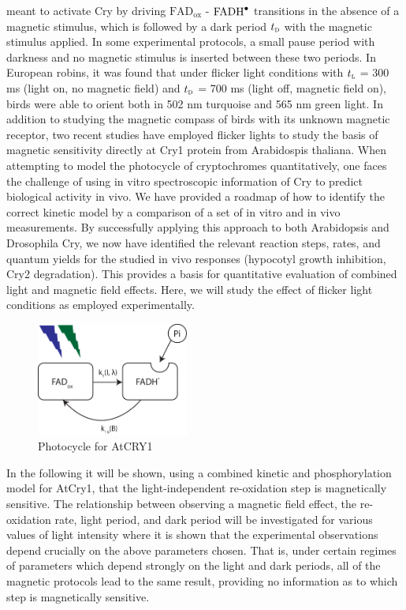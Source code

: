 \documentclass[twoside,twocolumn,9pt]{article}
\begin{document}
meant to activate Cry by driving $\text{FAD}_{\text{ox}}$ - $\ce{FADH^{.}}$ transitions in the absence of a magnetic stimulus, 
which is followed by a dark period $t_{\textsc{d}}$ with the magnetic stimulus applied. In some experimental protocols, a small 
pause period with darkness and no magnetic stimulus is inserted between these two periods. In European robins, it was found that 
under flicker light conditions with $t_{\textsc{l}}$ = 300 ms (light on, no magnetic field) and $t_{\textsc{d}}$ = 700 ms (light 
off, magnetic field on), birds were able to orient both in 502 nm turquoise and 565 nm green light.  
In addition to studying the magnetic compass of birds with its unknown magnetic receptor, two recent studies have employed flicker 
lights to study the basis of magnetic sensitivity directly at Cry1 protein from Arabidospis thaliana. 
When attempting to model the photocycle of cryptochromes quantitatively, one faces the challenge of using in vitro spectroscopic 
information of Cry to predict biological activity in vivo. We have provided a roadmap of how to identify the correct kinetic model 
by a comparison of a set of in vitro and in vivo measurements. By successfully applying this approach to both Arabidopsis 
\cite{Procopio2016} and Drosophila Cry, \cite{Arthaut2017} we now have identified the relevant reaction steps, rates, and quantum 
yields for the studied in vivo responses (hypocotyl growth inhibition, Cry2 degradation). This provides a basis for quantitative 
evaluation of combined light and magnetic field effects. Here, we will study the effect of flicker light conditions as employed 
experimentally. \cite{Pooam2019, Wiltschko2014}
\begin{figure}[h]
	\centering
	\includegraphics[width = 5cm, keepaspectratio]{photocycleTwoState.pdf}
	\caption{Photocycle for AtCRY1}
	\label{fig:photocycle}
\end{figure}

In the following it will be shown, using a combined kinetic and phosphorylation model for AtCry1, that the light-independent 
re-oxidation step is magnetically sensitive. The relationship between observing a magnetic field effect, the re-oxidation rate, 
light period, and dark period will be investigated for various values of light intensity where it is shown that the experimental 
observations depend crucially on the above parameters chosen. That is, under certain regimes of parameters which depend strongly on 
the light and dark periods, all of the magnetic protocols lead to the same result, providing no information as to which step is 
magnetically sensitive.
\end{document}

